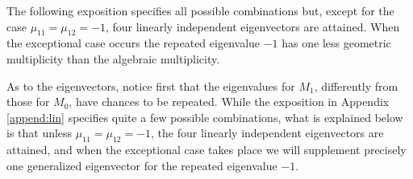 \documentclass[a4paper,11pt]{article}
\theoremstyle{remark}
\begin{document}

The following exposition specifies all possible combinations but, except for the case $\mu_{11}=\mu_{12}=-1$, four linearly independent eigenvectors are attained. 
When the exceptional case occurs the repeated eigenvalue $-1$ has one less geometric multiplicity than the algebraic multiplicity.%

As to the eigenvectors, notice first that the eigenvalues for $M_1$, differently from those for $M_0$, have chances to be repeated. While the exposition in
Appendix \ref{append:lin} specifies quite a few possible combinations, 
what is explained below is that unless $\mu_{11}=\mu_{12}=-1$, the four linearly independent eigenvectors are attained, and when the exceptional case takes place we will supplement precisely one generalized eigenvector for the repeated eigenvalue $-1$.
\end{document}
